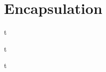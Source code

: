 \documentclass[../lecture5-objectorientation.tex]{subfiles}
\begin{document}
\section{Encapsulation}


\begin{frame}[fragile]{}
t
\end{frame}


\begin{frame}[fragile]{}
t
\end{frame}


\begin{frame}[fragile]{}
t
\end{frame}

\end{document}
